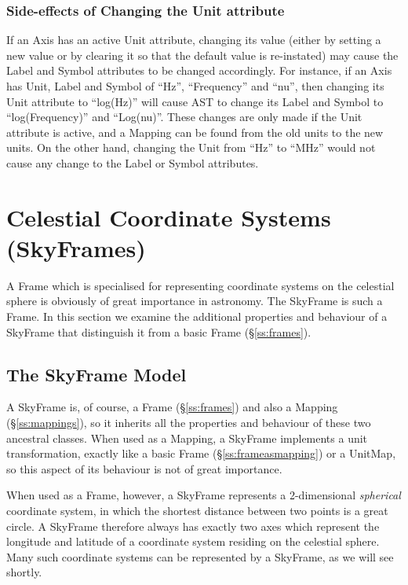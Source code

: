 \documentclass[twoside,11pt]{article}
\newcommand{\secref}[1]{\S\ref{#1}}
\newcommand{\secref}[1]{\ref{#1}}
\begin{document}
\subsubsection{Side-effects of Changing the Unit attribute}
If an Axis has an active Unit attribute, changing its value (either by
setting a new value or by clearing it so that the default value is
re-instated) may cause the Label and Symbol attributes to be changed
accordingly. For instance, if an Axis has Unit, Label and Symbol of ``Hz'',
``Frequency'' and ``nu'', then changing its Unit attribute to ``log(Hz)''
will cause AST to change its Label and Symbol to ``log(Frequency)'' and
``Log(nu)''. These changes are only made if the Unit attribute is active,
and a Mapping can be found from the old units to the new units. On the other
 hand, changing the Unit from ``Hz'' to ``MHz'' would not cause any change
to the Label or Symbol attributes.

\cleardoublepage
\section{\label{ss:skyframes}Celestial Coordinate Systems (SkyFrames)}

A Frame which is specialised for representing coordinate systems on
the celestial sphere is obviously of great importance in
astronomy. The SkyFrame is such a Frame. In this section we examine
the additional properties and behaviour of a SkyFrame that distinguish
it from a basic Frame (\secref{ss:frames}).

\subsection{The SkyFrame Model}

A SkyFrame is, of course, a Frame (\secref{ss:frames}) and also a
Mapping (\secref{ss:mappings}), so it inherits all the properties and
behaviour of these two ancestral classes.  When used as a Mapping, a
SkyFrame implements a unit transformation, exactly like a basic Frame
(\secref{ss:frameasmapping}) or a UnitMap, so this aspect of its
behaviour is not of great importance.

When used as a Frame, however, a SkyFrame represents a 2-dimensional
{\em{spherical}} coordinate system, in which the shortest distance
between two points is a great circle.  A SkyFrame therefore always has
exactly two axes which represent the longitude and latitude of a
coordinate system residing on the celestial sphere. Many such
coordinate systems can be represented by a SkyFrame, as we will see
shortly.
\end{document}
